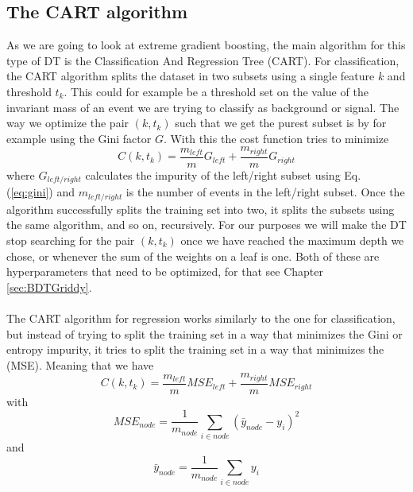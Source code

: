 \documentclass[12pt, a4paper]{book}
\begin{document}
\subsection{The CART algorithm} 
As we are going to look at extreme gradient boosting, the main algorithm for this type of DT is the Classification And Regression Tree (CART). For classification, the CART algorithm splits the dataset in two subsets using a single feature $k$ and threshold $t_k$. This could for example be 
a threshold set on the value of the invariant mass of an event we are trying to classify as background or signal. The way we optimize the pair $(k,t_k)$ such that we get the purest subset is by for example using the Gini factor $G$. With this the cost function tries to minimize
$$
C(k,t_k)=\frac{m_{left}}{m}G_{left}+\frac{m_{right}}{m}G_{right}
$$
where $G_{left/right}$ calculates the impurity of the left/right subset using Eq. (\ref{eq:gini}) and $m_{left/right}$ is the number of events in the left/right subset. Once the algorithm successfully splits the training set into two, it splits the subsets using the same algorithm, and so on, 
recursively. For our purposes we will make the DT stop searching for the pair $(k,t_k)$ once we have reached the maximum depth we chose, or whenever the sum of the weights on a leaf is one. Both of these are hyperparameters that need to be optimized, for that see Chapter \ref{sec:BDTGriddy}.\\
\\The CART algorithm for regression works similarly to the one for classification, but instead of trying to split the training set in a way that minimizes the Gini or entropy impurity, it tries to split the training set in a way that minimizes the (MSE). Meaning that we have
$$
C(k,t_k)=\frac{m_{left}}{m}MSE_{left}+\frac{m_{right}}{m}MSE_{right}
$$
with
$$
MSE_{node} = \frac{1}{m_{node}}\sum_{i\in node}(\bar{y}_{node} -y_i)^2
$$
and
$$
\bar{y}_{node} = \frac{1}{m_{node}}\sum_{i\in node}y_i
$$
\end{document}
